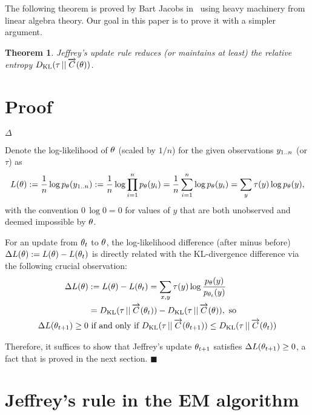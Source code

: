 \documentclass{article}
\newtheorem{theorem}{Theorem}
\begin{document}
The following theorem is proved by Bart Jacobs in~\cite{jacobs2021learning} using heavy machinery from linear algebra theory.
Our goal in this paper is to prove it with a simpler argument.

\begin{theorem}\label{eq:theorem}
Jeffrey's update rule reduces (or maintains at least) the relative entropy $\DKL[\py][\Cfwd(\px)]$.
\end{theorem}


\section{Proof}

{\ensuremath{\Delta}\DKL[#1][#2]}

Denote the log-likelihood of ${\theta}$ (scaled by $1/n$) for the given observations ${y_{1..n}}$ (or $\tau$) as
\begin{equation}
    L({\theta}) := \frac{1}{n}\log {p_{\ensuremath{\theta}}}({y_{1..n}}) := \frac{1}{n}\log \prod_{i=1}^n {p_{\theta}}(y_i) = \frac{1}{n}\sum_{i=1}^n \log {p_{\ensuremath{\theta}}}(y_i) = \sum_y {\tau}(y) \log {p_{\ensuremath{\theta}}}(y),
    \label{eq:log-likelihood}
\end{equation}
with the convention $0\, \log 0 = 0$ for values of $y$ that are both unobserved and deemed impossible by ${\theta}$.

For an update from ${\theta}_t$ to ${\theta}$, the log-likelihood difference (after minus before) $\Delta L({\theta}):= L({\theta}) - L({{\theta}_t})$ is directly related with the KL-divergence difference via the following crucial observation:
\begin{align}
    \Delta L(\px) &:= L(\px) - L(\pxt)
    = \sum_{x,y} \tau(y) \log \frac{\ppx(y)}{\ppxt(y)}
    \notag\\
    &= \DKL[\py][\Cfwd(\px_{t})] - \DKL[\py][\Cfwd(\px)], \label{eq:DeltaL}
    \notag
    \text{ so}\\
    \Delta L(\px_{t+1}) \geq 0 &\text{ if and only if } \DKL[\py][\Cfwd(\px_{t+1})] \leq \DKL[\py][\Cfwd(\px_t)]
\end{align}

Therefore, it suffices to show that Jeffrey's update ${\theta}_{t+1}$ satisfies $\Delta L({\theta}_{t+1})\geq 0$, a fact that is proved in the next section.
\hfill$\blacksquare$


\section{Jeffrey's rule in the EM algorithm}
\end{document}
